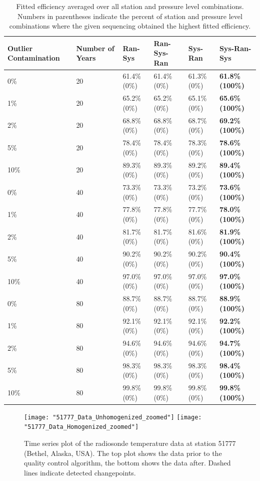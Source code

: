 \documentclass[12pt]{article}
\begin{document}
\begin{landscape}
\begin{table}[ht]
	\centering
	\begin{tabular}{ll|llll}
		\hline
		Outlier Contamination & Number of Years & Ran-Sys & Ran-Sys-Ran & Sys-Ran & Sys-Ran-Sys \\ 
		\hline
		0\% & 20 & 61.4\% (0\%) & 61.4\% (0\%) & 61.3\% (0\%) & \textbf{61.8\% (100\%)} \\ 
  		1\% & 20 & 65.2\% (0\%) & 65.2\% (0\%) & 65.1\% (0\%) & \textbf{65.6\% (100\%)} \\ 
  		2\% & 20 & 68.8\% (0\%) & 68.8\% (0\%) & 68.7\% (0\%) & \textbf{69.2\% (100\%)} \\ 
  		5\% & 20 & 78.4\% (0\%) & 78.4\% (0\%) & 78.3\% (0\%) & \textbf{78.6\% (100\%)} \\ 
  		10\% & 20 & 89.3\% (0\%) & 89.3\% (0\%) & 89.2\% (0\%) & \textbf{89.4\% (100\%)} \\ 
  		\hline
  		0\% & 40 & 73.3\% (0\%) & 73.3\% (0\%) & 73.2\% (0\%) & \textbf{73.6\% (100\%)} \\ 
  		1\% & 40 & 77.8\% (0\%) & 77.8\% (0\%) & 77.7\% (0\%) & \textbf{78.0\% (100\%)} \\ 
  		2\% & 40 & 81.7\% (0\%) & 81.7\% (0\%) & 81.6\% (0\%) & \textbf{81.9\% (100\%)} \\ 
  		5\% & 40 & 90.2\% (0\%) & 90.2\% (0\%) & 90.2\% (0\%) & \textbf{90.4\% (100\%)} \\ 
  		10\% & 40 & 97.0\% (0\%) & 97.0\% (0\%) & 97.0\% (0\%) & \textbf{97.0\% (100\%)} \\ 
  		\hline
  		0\% & 80 & 88.7\% (0\%) & 88.7\% (0\%) & 88.7\% (0\%) & \textbf{88.9\% (100\%)} \\ 
  		1\% & 80 & 92.1\% (0\%) & 92.1\% (0\%) & 92.1\% (0\%) & \textbf{92.2\% (100\%)} \\ 
  		2\% & 80 & 94.6\% (0\%) & 94.6\% (0\%) & 94.6\% (0\%) & \textbf{94.7\% (100\%)} \\ 
  		5\% & 80 & 98.3\% (0\%) & 98.3\% (0\%) & 98.3\% (0\%) & \textbf{98.4\% (100\%)} \\ 
  		10\% & 80 & 99.8\% (0\%) & 99.8\% (0\%) & 99.8\% (0\%) & \textbf{99.8\% (100\%)} \\ 
  		\hline
	\end{tabular}
	\caption{Fitted efficiency averaged over all station and pressure level combinations.  Numbers in parentheses indicate the percent of station and pressure level combinations where the given sequencing obtained the highest fitted efficiency.}
	\label{tab:fitEff}
\end{table}
\end{landscape}

\begin{figure}
	\centering
	\texttt{[image: "51777\_Data\_Unhomogenized\_zoomed"]}
	\texttt{[image: "51777\_Data\_Homogenized\_zoomed"]}
	\caption{Time series plot of the radiosonde temperature data at station 51777 (Bethel, Alaska, USA).  The top plot shows the data prior to the quality control algorithm, the bottom shows the data after.  Dashed lines indicate detected changepoints.}
	\label{fig:caseStudy}
\end{figure}
\end{document}
